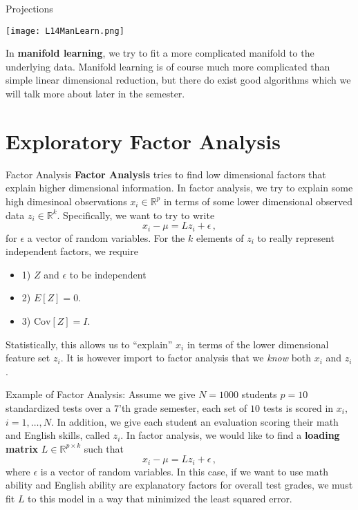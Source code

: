 \documentclass[10pt, table, dvipsnames,xcdraw,handout]{beamer}
\begin{document}
\begin{frame}[fragile]{Projections}
  \begin{minipage}[t][0.5\textheight][t]{\textwidth}
	\centering \texttt{[image: L14ManLearn.png]} 
  \end{minipage}
  \vfill
\begin{minipage}[t][0.5\textheight][t]{\textwidth}
In \textbf{manifold learning}, we try to fit a more complicated manifold to the underlying data. Manifold learning is of course much more complicated than simple linear dimensional reduction, but there do exist good algorithms which we will talk more about later in the semester. 
\end{minipage}
\end{frame}


\section{Exploratory Factor Analysis}


\begin{frame}[fragile]{Factor Analysis}
\textbf{Factor Analysis} tries to find low dimensional factors that explain higher dimensional information. In factor analysis, we try to explain some high dimesinoal observations $x_i\in \mathbb{R}^p$ in terms of some lower dimensional observed data $z_i\in \mathbb{R}^k$. Specifically, we want to try to write
$$
x_i - \mu = L z_i + \epsilon\,,
$$
for $\epsilon$ a vector of random variables. For the $k$ elements of $z_i$ to really represent independent factors, we require 
\begin{itemize}
\item 1) $Z$ and $\epsilon$ to be independent
\item 2) $E[Z] = 0$.
\item 3) $\text{Cov}[Z] = I$. 
\end{itemize}
Statistically, this allows us to ``explain'' $x_i$ in terms of the lower dimensional feature set $z_i$. It is however import to factor analysis that we \emph{know} both $x_i$ and $z_i$. 
\end{frame}



\begin{frame}[fragile]{Example of Factor Analysis:}
Assume we give $N=1000$ students $p = 10$ standardized tests over a 7'th grade semester, each set of $10$ tests is scored in $x_i$, $i=1,\ldots, N$. In addition, we give each student an evaluation scoring their math and English skills, called $z_i$. In factor analysis, we would like to find a \textbf{loading matrix} $L\in\mathbb{R}^{p\times k}$ such that
$$
x_i - \mu = L z_i + \epsilon\,,
$$
where $\epsilon$ is a vector of random variables. In this case, if we want to use math ability and English ability are explanatory factors for overall test grades, we must fit $L$ to this model in a way that minimized the least squared error.
\end{frame}
\end{document}
